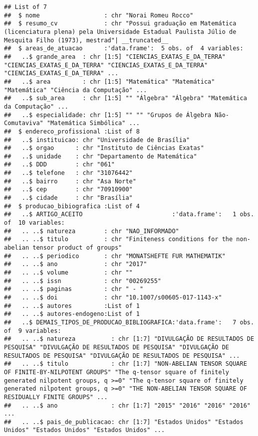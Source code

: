 \documentclass[]{article}
\begin{document}
\begin{verbatim}
## List of 7
##  $ nome                  : chr "Norai Romeu Rocco"
##  $ resumo_cv             : chr "Possui graduação em Matemática (licenciatura plena) pela Universidade Estadual Paulista Júlio de Mesquita Filho (1973), mestrad"| __truncated__
##  $ areas_de_atuacao      :'data.frame':  5 obs. of  4 variables:
##   ..$ grande_area  : chr [1:5] "CIENCIAS_EXATAS_E_DA_TERRA" "CIENCIAS_EXATAS_E_DA_TERRA" "CIENCIAS_EXATAS_E_DA_TERRA" "CIENCIAS_EXATAS_E_DA_TERRA" ...
##   ..$ area         : chr [1:5] "Matemática" "Matemática" "Matemática" "Ciência da Computação" ...
##   ..$ sub_area     : chr [1:5] "" "Álgebra" "Álgebra" "Matemática da Computação" ...
##   ..$ especialidade: chr [1:5] "" "" "Grupos de Álgebra Não-Comutaviva" "Matemática Simbólica" ...
##  $ endereco_profissional :List of 8
##   ..$ instituicao: chr "Universidade de Brasília"
##   ..$ orgao      : chr "Instituto de Ciências Exatas"
##   ..$ unidade    : chr "Departamento de Matemática"
##   ..$ DDD        : chr "061"
##   ..$ telefone   : chr "31076442"
##   ..$ bairro     : chr "Asa Norte"
##   ..$ cep        : chr "70910900"
##   ..$ cidade     : chr "Brasília"
##  $ producao_bibiografica :List of 4
##   ..$ ARTIGO_ACEITO                         :'data.frame':   1 obs. of  10 variables:
##   .. ..$ natureza        : chr "NAO_INFORMADO"
##   .. ..$ titulo          : chr "Finiteness conditions for the non-abelian tensor product of groups"
##   .. ..$ periodico       : chr "MONATSHEFTE FUR MATHEMATIK"
##   .. ..$ ano             : chr "2017"
##   .. ..$ volume          : chr ""
##   .. ..$ issn            : chr "00269255"
##   .. ..$ paginas         : chr " - "
##   .. ..$ doi             : chr "10.1007/s00605-017-1143-x"
##   .. ..$ autores         :List of 1
##   .. ..$ autores-endogeno:List of 1
##   ..$ DEMAIS_TIPOS_DE_PRODUCAO_BIBLIOGRAFICA:'data.frame':   7 obs. of  9 variables:
##   .. ..$ natureza          : chr [1:7] "DIVULGAÇÃO DE RESULTADOS DE PESQUISA" "DIVULGAÇÃO DE RESULTADOS DE PESQUISA" "DIVULGAÇÃO DE RESULTADOS DE PESQUISA" "DIVULGAÇÃO DE RESULTADOS DE PESQUISA" ...
##   .. ..$ titulo            : chr [1:7] "NON-ABELIAN TENSOR SQUARE OF FINITE-BY-NILPOTENT GROUPS" "The q-tensor square of finitely generated nilpotent groups, q >=0" "The q-tensor square of finitely generated nilpotent groups, q >=0" "THE NON-ABELIAN TENSOR SQUARE OF RESIDUALLY FINITE GROUPS" ...
##   .. ..$ ano               : chr [1:7] "2015" "2016" "2016" "2016" ...
##   .. ..$ pais_de_publicacao: chr [1:7] "Estados Unidos" "Estados Unidos" "Estados Unidos" "Estados Unidos" ...

\end{verbatim}
\end{document}

